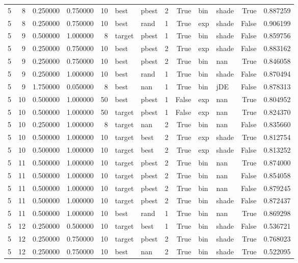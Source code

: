 \begin{tabular}{rrrrrllrrllrr}
5 & 8 & 0.250000 & 0.750000 & 10 & best & pbest & 2 & True & bin & shade & True & 0.887259 \\
5 & 8 & 0.250000 & 0.750000 & 10 & best & rand & 1 & True & exp & shade & False & 0.906199 \\
5 & 9 & 0.500000 & 1.000000 & 8 & target & pbest & 1 & True & bin & shade & False & 0.859756 \\
5 & 9 & 0.250000 & 0.750000 & 10 & best & pbest & 2 & True & exp & shade & False & 0.883162 \\
5 & 9 & 0.250000 & 0.750000 & 10 & best & pbest & 2 & True & bin & nan & True & 0.846058 \\
5 & 9 & 0.250000 & 1.000000 & 10 & best & rand & 1 & True & bin & shade & False & 0.870494 \\
5 & 9 & 1.750000 & 0.050000 & 8 & best & nan & 1 & True & bin & jDE & False & 0.878313 \\
5 & 10 & 0.500000 & 1.000000 & 50 & best & pbest & 1 & False & exp & nan & True & 0.804952 \\
5 & 10 & 0.500000 & 1.000000 & 50 & target & pbest & 1 & False & exp & nan & True & 0.824370 \\
5 & 10 & 0.250000 & 1.000000 & 8 & target & nan & 2 & True & bin & nan & False & 0.835660 \\
5 & 10 & 0.500000 & 1.000000 & 10 & target & best & 2 & True & exp & shade & True & 0.812754 \\
5 & 10 & 0.500000 & 1.000000 & 10 & target & best & 2 & True & exp & shade & False & 0.813252 \\
5 & 11 & 0.500000 & 1.000000 & 10 & target & pbest & 2 & True & bin & nan & True & 0.874000 \\
5 & 11 & 0.500000 & 1.000000 & 10 & target & pbest & 2 & True & bin & nan & False & 0.854058 \\
5 & 11 & 0.500000 & 1.000000 & 10 & target & pbest & 2 & True & bin & nan & False & 0.879245 \\
5 & 11 & 0.500000 & 1.000000 & 10 & target & pbest & 2 & True & bin & shade & False & 0.872437 \\
5 & 11 & 0.500000 & 1.000000 & 10 & best & rand & 1 & True & bin & nan & True & 0.869298 \\
5 & 12 & 0.250000 & 0.500000 & 10 & target & best & 1 & True & bin & shade & False & 0.536721 \\
5 & 12 & 0.250000 & 0.750000 & 10 & target & pbest & 2 & True & bin & shade & True & 0.768023 \\
5 & 12 & 0.250000 & 0.750000 & 10 & best & nan & 2 & True & bin & shade & True & 0.522095 \\

\end{tabular}
